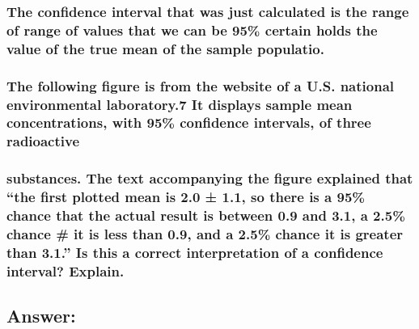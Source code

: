 \documentclass[]{article}
\begin{document}
\subsubsection{The confidence interval that was just calculated is the
range of range of values that we can be 95\% certain holds the value of
the true mean of the sample
populatio.}\label{the-confidence-interval-that-was-just-calculated-is-the-range-of-range-of-values-that-we-can-be-95-certain-holds-the-value-of-the-true-mean-of-the-sample-populatio.}

\subsubsection{The following figure is from the website of a U.S.
national environmental laboratory.7 It displays sample mean
concentrations, with 95\% confidence intervals, of three
radioactive}\label{the-following-figure-is-from-the-website-of-a-u.s.-national-environmental-laboratory.7-it-displays-sample-mean-concentrations-with-95-confidence-intervals-of-three-radioactive}

\subsubsection{\texorpdfstring{substances. The text accompanying the
figure explained that ``the first plotted mean is 2.0 ± 1.1, so there is
a 95\% chance that the actual result is between 0.9 and 3.1, a 2.5\%
chance \# it is less than 0.9, and a 2.5\% chance it is greater than
3.1.'' Is this a correct interpretation of a confidence interval?
Explain.}{substances. The text accompanying the figure explained that the first plotted mean is 2.0 ± 1.1, so there is a 95\% chance that the actual result is between 0.9 and 3.1, a 2.5\% chance \# it is less than 0.9, and a 2.5\% chance it is greater than 3.1. Is this a correct interpretation of a confidence interval? Explain.}}\label{substances.-the-text-accompanying-the-figure-explained-that-the-first-plotted-mean-is-2.0-1.1-so-there-is-a-95-chance-that-the-actual-result-is-between-0.9-and-3.1-a-2.5-chance-it-is-less-than-0.9-and-a-2.5-chance-it-is-greater-than-3.1.-is-this-a-correct-interpretation-of-a-confidence-interval-explain.}

\subsection{Answer:}\label{answer-1}
\end{document}
